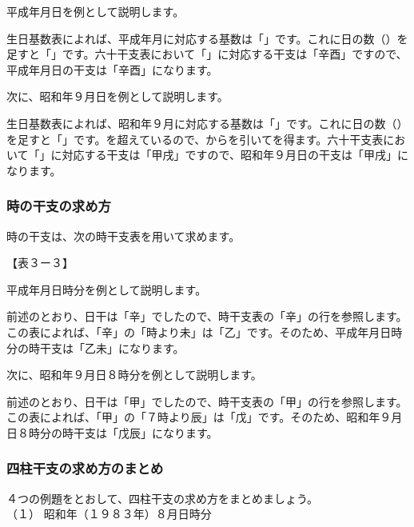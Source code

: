 \documentclass[a5paper,11pt,dvipdfmx]{tarticle}
\begin{document}
平成年月日を例として説明します。

生日基数表によれば、平成年月に対応する基数は「」です。これに日の数（）を足すと「」です。六十干支表において「」に対応する干支は「辛酉」ですので、平成年月日の干支は「辛酉」になります。

次に、昭和年９月日を例として説明します。

生日基数表によれば、昭和年９月に対応する基数は「」です。これに日の数（）を足すと「」です。を超えているので、からを引いてを得ます。六十干支表において「」に対応する干支は「甲戌」ですので、昭和年９月日の干支は「甲戌」になります。


\subsubsection*{時の干支の求め方}

時の干支は、次の時干支表を用いて求めます。

【表３ー３】

平成年月日時分を例として説明します。

前述のとおり、日干は「辛」でしたので、時干支表の「辛」の行を参照します。この表によれば、「辛」の「時より未」は「乙」です。そのため、平成年月日時分の時干支は「乙未」になります。

次に、昭和年９月日８時分を例として説明します。

前述のとおり、日干は「甲」でしたので、時干支表の「甲」の行を参照します。この表によれば、「甲」の「７時より辰」は「戊」です。そのため、昭和年９月日８時分の時干支は「戊辰」になります。

\subsubsection*{四柱干支の求め方のまとめ}
４つの例題をとおして、四柱干支の求め方をまとめましょう。\\

（１）	昭和年（１９８３年）８月日時分
\end{document}

